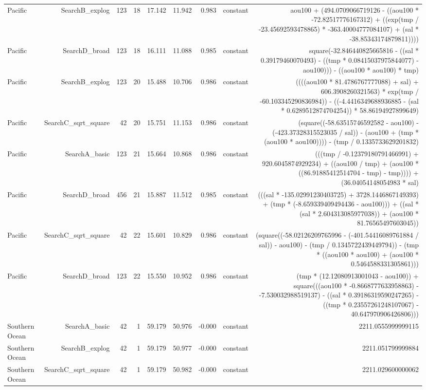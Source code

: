 \begin{table}
{\begin{tabular}{lrrrrrrrr}
Pacific & SearchB\_explog & 123 & 18 & 17.142 & 11.942 & 0.983 & constant & aou100 + (494.0709066719126 - ((aou100 * -72.82517776167312) + ((exp(tmp / -23.45692593478865) * -363.40004777084107) + (sal * -38.85343174879811)))) \\
Pacific & SearchD\_broad & 123 & 18 & 16.111 & 11.088 & 0.985 & constant & square(-32.846440825665816 - ((sal * 0.39179460070493) - ((tmp * 0.08415037975844077) - aou100))) - ((aou100 * aou100) * tmp) \\
Pacific & SearchB\_explog & 123 & 20 & 15.488 & 10.706 & 0.986 & constant & ((((aou100 * 81.4786767777088) + sal) + 606.3908260321563) * exp(tmp / -60.103345290836984)) - ((-4.4416349688936885 - (sal * 0.6289512874704254)) * 58.86194927899649) \\
Pacific & SearchC\_sqrt\_square & 42 & 20 & 15.751 & 11.153 & 0.986 & constant & (square((-58.63515746592582 - aou100) - (-423.37328315523035 / sal)) - (aou100 + (tmp * (aou100 * aou100)))) - (tmp / 0.1335733629201832) \\
Pacific & SearchA\_basic & 123 & 21 & 15.664 & 10.868 & 0.986 & constant & (((tmp / -0.12379180791466991) + 920.6045874929234) + ((aou100 / tmp) + (aou100 * ((86.91885412514704 - tmp) - tmp)))) + (36.04054148054983 * sal) \\
Pacific & SearchD\_broad & 456 & 21 & 15.887 & 11.512 & 0.985 & constant & (((sal * -135.02991230403725) + 3728.1446867149393) + (tmp * (-8.659339409494436 - aou100))) + ((sal * (sal * 2.604313085977038)) + (aou100 * 81.76565497603045)) \\
Pacific & SearchC\_sqrt\_square & 42 & 22 & 15.601 & 10.829 & 0.986 & constant & (square((-58.02126209765996 - (-401.54416089761884 / sal)) - aou100) - (tmp / 0.1345722439449794)) - (tmp * ((aou100 * aou100) + (aou100 * 0.5464588331305861))) \\
Pacific & SearchD\_broad & 123 & 22 & 15.550 & 10.952 & 0.986 & constant & (tmp * (12.12080913001043 - aou100)) + square(((aou100 * -0.8668777633958863) - -7.530032988519137) - ((sal * 0.39186319590247265) - ((tmp * 0.23557261248107067) - 40.647970906426806))) \\
Southern Ocean & SearchA\_basic & 42 & 1 & 59.179 & 50.976 & -0.000 & constant & 2211.0555999999115 \\
Southern Ocean & SearchB\_explog & 42 & 1 & 59.179 & 50.977 & -0.000 & constant & 2211.051799999884 \\
Southern Ocean & SearchC\_sqrt\_square & 42 & 1 & 59.179 & 50.982 & -0.000 & constant & 2211.029600000062 \\

\end{tabular}}
\end{table}
